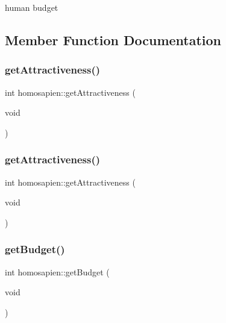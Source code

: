 human budget 



\subsection{Member Function Documentation}
\mbox{\label{classhomosapien_a36bfd2262341cc01977ee077a7e5f619}} 
\subsubsection{\texorpdfstring{get\+Attractiveness()}{getAttractiveness()}\hspace{0.1cm}{\footnotesize\ttfamily [1/2]}}
{\footnotesize\ttfamily int homosapien\+::get\+Attractiveness (\begin{DoxyParamCaption}\item[{void}]{ }\end{DoxyParamCaption})}

\mbox{\label{classhomosapien_a36bfd2262341cc01977ee077a7e5f619}} 
\subsubsection{\texorpdfstring{get\+Attractiveness()}{getAttractiveness()}\hspace{0.1cm}{\footnotesize\ttfamily [2/2]}}
{\footnotesize\ttfamily int homosapien\+::get\+Attractiveness (\begin{DoxyParamCaption}\item[{void}]{ }\end{DoxyParamCaption})}

\mbox{\label{classhomosapien_a372c40e87592045235e89956ddda2488}} 
\subsubsection{\texorpdfstring{get\+Budget()}{getBudget()}\hspace{0.1cm}{\footnotesize\ttfamily [1/2]}}
{\footnotesize\ttfamily int homosapien\+::get\+Budget (\begin{DoxyParamCaption}\item[{void}]{ }\end{DoxyParamCaption})}

